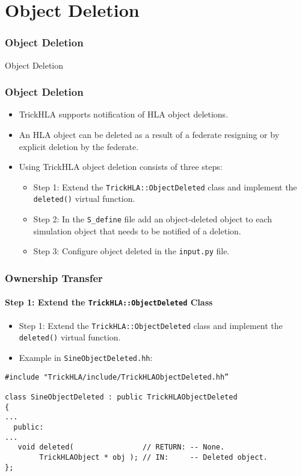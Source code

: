 
   \section{Object Deletion}

   \begin{frame}
      \frametitle{Object Deletion}
      \begin{center}
      \Huge{Object Deletion}
      \end{center}
   \end{frame}
   
   \begin{frame}
      \frametitle{Object Deletion}
      \begin{itemize}
         \item TrickHLA supports notification of HLA object deletions.
         \item An HLA object can be deleted as a result of a federate resigning
         or by explicit deletion by the federate.
         \item Using TrickHLA object deletion consists of three steps:
         \begin{itemize}
            \item Step 1: Extend the \texttt{TrickHLA::ObjectDeleted} class
            and implement the \texttt{deleted()} virtual function.
            \item Step 2: In the \texttt{S\_define} file add an object-deleted
            object to each simulation object that needs to be notified of a
            deletion.
            \item Step 3: Configure object deleted in the \texttt{input.py} file.
         \end{itemize}
      \end{itemize}
   \end{frame}

   \begin{frame}[fragile]
      \frametitle{Ownership Transfer}
      \framesubtitle{Step 1: Extend the \texttt{TrickHLA::ObjectDeleted} Class}
      \begin{itemize}
         \item Step 1: Extend the \texttt{TrickHLA::ObjectDeleted} class and
         implement the \texttt{deleted()} virtual function.
         \item Example in \texttt{SineObjectDeleted.hh}:
      \end{itemize}
\begin{Verbatim}[frame=single, fontsize=\scriptsize]
#include "TrickHLA/include/TrickHLAObjectDeleted.hh”

class SineObjectDeleted : public TrickHLAObjectDeleted
{
...
  public:
...
   void deleted(                // RETURN: -- None.
        TrickHLAObject * obj ); // IN:     -- Deleted object.
};
\end{Verbatim}
   \end{frame}

